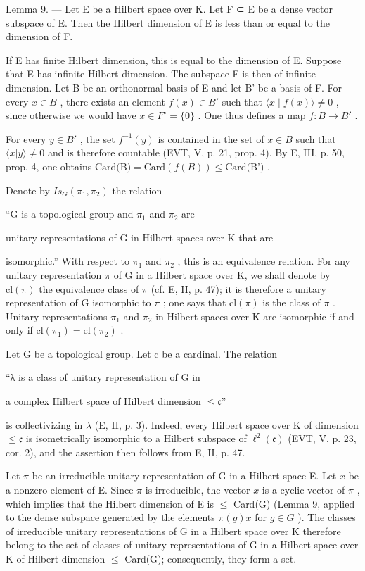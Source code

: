 Lemma 9. --- Let E be a Hilbert space over K. Let F ⊂ E be a dense vector subspace of E. Then the Hilbert dimension of E is less than or equal to the dimension of F.

If E has finite Hilbert dimension, this is equal to the dimension of E. Suppose that E has infinite Hilbert dimension. The subspace F is then of infinite dimension. Let B be an orthonormal basis of E and let B' be a basis of F. For every \(x \in B\) , there exists an element \(f(x) \in B'\) such that \(\langle x \mid f(x) \rangle \neq 0\) , since otherwise we would have \(x \in F^{\circ} = \{0\}\) . One thus defines a map \(f: B \to B'\) .

For every \(y \in B'\) , the set \(f^{-1}(y)\) is contained in the set of \(x \in B\) such that \(\langle x | y \rangle \neq 0\) and is therefore countable (EVT, V, p. 21, prop. 4). By E, III, p. 50, prop. 4, one obtains \(\text{Card(B)} = \text{Card}(f(B)) \leqslant \text{Card(B')}\) .

Denote by \(Is_{G}(\pi_{1},\pi_{2})\) the relation

“G is a topological group and \(\pi_{1}\) and \(\pi_{2}\) are

unitary representations of G in Hilbert spaces over K that are

isomorphic.” With respect to \(\pi_{1}\) and \(\pi_{2}\) , this is an equivalence relation. For any unitary representation \(\pi\) of G in a Hilbert space over K, we shall denote by \(\mathrm{cl}(\pi)\) the equivalence class of \(\pi\) (cf. E, II, p. 47); it is therefore a unitary representation of G isomorphic to \(\pi\) ; one says that \(\mathrm{cl}(\pi)\) is the class of \(\pi\) . Unitary representations \(\pi_{1}\) and \(\pi_{2}\) in Hilbert spaces over K are isomorphic if and only if \(\mathrm{cl}(\pi_{1}) = \mathrm{cl}(\pi_{2})\) .

Let G be a topological group. Let c be a cardinal. The relation

“λ is a class of unitary representation of G in

a complex Hilbert space of Hilbert dimension \(\leqslant\mathfrak{c}\)”

is collectivizing in \(\lambda\) (E, II, p. 3). Indeed, every Hilbert space over K of dimension \(\leqslant \mathfrak{c}\) is isometrically isomorphic to a Hilbert subspace of \(\ell^2 (\mathfrak{c})\) (EVT, V, p. 23, cor. 2), and the assertion then follows from E, II, p. 47.

Let \(\pi\) be an irreducible unitary representation of G in a Hilbert space E. Let \(x\) be a nonzero element of E. Since \(\pi\) is irreducible, the vector \(x\) is a cyclic vector of \(\pi\) , which implies that the Hilbert dimension of E is \(\leqslant\) Card(G) (Lemma 9, applied to the dense subspace generated by the elements \(\pi(g)x\) for \(g \in G\) ). The classes of irreducible unitary representations of G in a Hilbert space over K therefore belong to the set of classes of unitary representations of G in a Hilbert space over K of Hilbert dimension \(\leqslant\) Card(G); consequently, they form a set.

